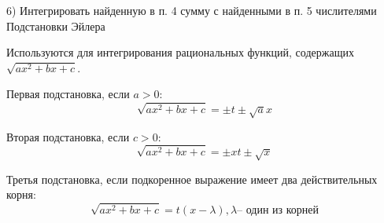 \documentclass{article}
\begin{document}
    6) Интегрировать найденную в п. 4 сумму с найденными в п. 5 числителями\\
    
    \large{Подстановки Эйлера}\small   
    
    Используются для интегрирования рациональных функций, содержащих $\sqrt{ax^2+bx+c}$.
    
    Первая подстановка, если $a>0$:
    \begin{equation}
        \sqrt{ax^2+bx+c} = \pm t \pm \sqrt{a} x
    \end{equation}
    
    Вторая подстановка, если $c>0$:
    \begin{equation}
        \sqrt{ax^2 + bx + c} = \pm xt \pm \sqrt{x}
    \end{equation}
    
    Третья подстановка, если подкоренное выражение имеет два действительных корня:
    \begin{equation}
        \sqrt{ax^2+bx+c}=t(x-\lambda), \lambda \text{-- один из корней}
    \end{equation}
\end{document}
